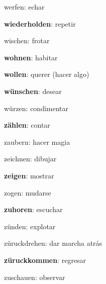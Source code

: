 \begin{multicols}{2}
\begin{myitemize}
\item werfen: echar
\item \textbf{wiederholden}: repetir
\item wischen: frotar
\item \textbf{wohnen}: habitar
\item \textbf{wollen}: querer (hacer algo)
\item \textbf{wünschen}: desear
\item würzen: condimentar
\item \textbf{zählen}: contar
\item zaubern: hacer magia
\item zeichnen: dibujar
\item \textbf{zeigen}: mostrar
\item zogen: mudarse
\item \textbf{zuhoren}: escuchar
\item zünden: explotar
\item züruckdrehen: dar marcha atrás
\item \textbf{züruckkommen}: regresar
\item zuschauen: observar
\end{myitemize}
\end{multicols}
